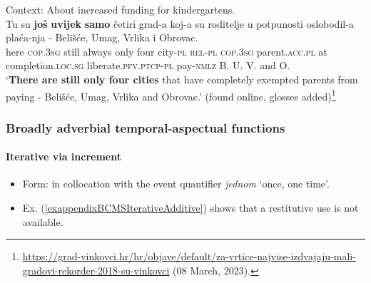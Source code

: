 \begin{exe}
	\pagebreak
	\ex
	Context: About increased funding for kindergartens.\label{exappendixBCMSScalar5}\\
	\gll Tu su \textbf{još} \textbf{uvijek} \textbf{samo} četiri grad-a koj-a su roditelje u potpunosti oslobodil-a plaća-nja - Belišće, Umag, Vrlika i Obrovac.\\
	here \textsc{cop}.3\textsc{sg} still always only four city-\textsc{pl} \textsc{rel}-\textsc{pl} \textsc{cop}.3\textsc{sg} parent.\textsc{acc}.\textsc{pl} at completion.\textsc{loc}.\textsc{sg} liberate.\textsc{pfv}.\textsc{ptcp}-\textsc{pl} pay-\textsc{nmlz} {} B. U. V. and O.\\
	\glt \lq \textbf{There are still only four cities} that have completely exempted parents from paying - Belišće, Umag, Vrlika and Obrovac.\rq{ }(found online, glosses added)\footnote{\url{https://grad-vinkovci.hr/hr/objave/default/za-vrtice-najvise-izdvajaju-mali-gradovi-rekorder-2018-su-vinkovci} (08 March, 2023).}
\end{exe} 



\subsubsection{Broadly adverbial temporal-aspectual functions}
\paragraph{Iterative via increment}
\label{appendixBCMSIterativeIncrement}
\begin{itemize}
	\item Form: in collocation with the event quantifier \textit{jednom} \lq once, one time'.
	\item Ex. (\ref{exappendixBCMSIterativeAdditive}) shows that a restitutive use is not available.
\end{itemize}

